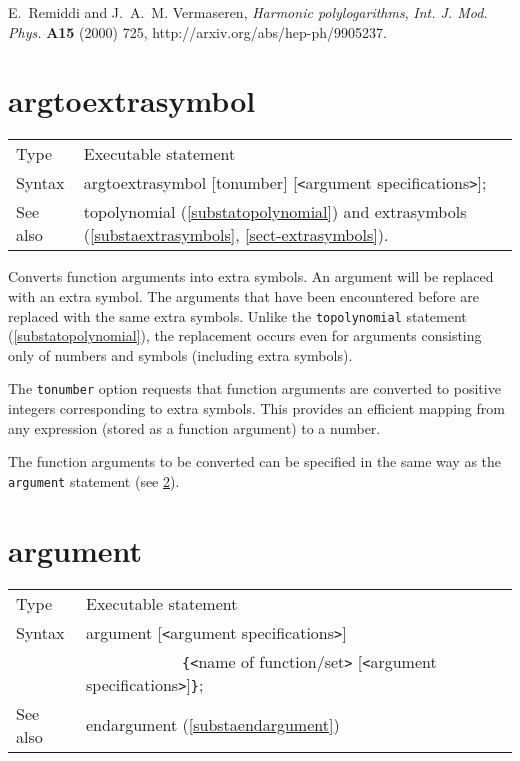 E.~Remiddi and J.~A.~M. Vermaseren, {\it Harmonic polylogarithms},  {\em 
Int. J. Mod. Phys.} {\bf A15} (2000) 725,
  http://arxiv.org/abs/hep-ph/9905237.
\vspace{10mm}


\section{argtoextrasymbol}
\label{substaargtoextrasymbol}

\noindent
\begin{tabular}{ll}
Type &
  Executable statement \\
Syntax &
  argtoextrasymbol [tonumber] [{\tt<}argument specifications{\tt>}]; \\
See also &
  topolynomial (\ref{substatopolynomial}) and
  extrasymbols (\ref{substaextrasymbols}, \ref{sect-extrasymbols}).
\end{tabular}
\vspace{4mm}

\noindent
Converts function arguments into extra symbols. 
An argument will be replaced with an extra symbol. 
The arguments that have been encountered before are replaced with the same 
extra symbols. 
Unlike the \texttt{topolynomial} statement (\ref{substatopolynomial}), the 
replacement occurs even for arguments consisting only of numbers and symbols 
(including extra symbols). 
\vspace{4mm}

\noindent
The \texttt{tonumber} option requests that function arguments are converted to 
positive integers corresponding to extra symbols. This provides an efficient 
mapping from any expression (stored as a function argument) to a number. 
\vspace{4mm}

\noindent
The function arguments to be converted can be specified in the same way as the 
\texttt{argument} statement (see \ref{substaargument}). 
\vspace{10mm}


\section{argument}
\label{substaargument}

\noindent \begin{tabular}{ll}
Type & Executable statement\\
Syntax & argument [{\tt<}argument specifications{\tt>}] \\ &
    \ \ \ \ \ \ \ \ \ \ \ \
 \verb:{:{\tt<}name of function/set{\tt>}
[{\tt<}argument specifications{\tt>}]\verb:}:; \\
See also & endargument (\ref{substaendargument})
\end{tabular} \vspace{4mm}

